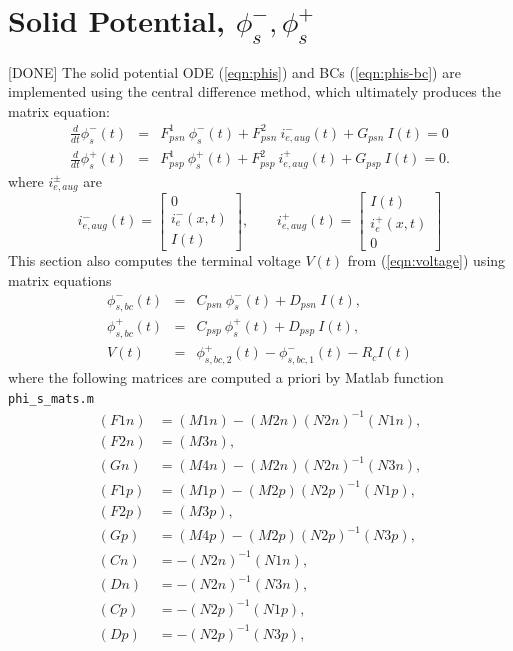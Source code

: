 \documentclass[12pt]{article}
\newcommand{\green}[1]{{\color{green}#1}}
\begin{document}
\section{Solid Potential, $\phi_{s}^{-}, \phi_{s}^{+}$}\label{sec:phis}
\green{[DONE]} The solid potential ODE (\ref{eqn:phis}) and BCs (\ref{eqn:phis-bc}) are implemented using the central difference method, which ultimately produces the matrix equation:
\begin{eqnarray}
	\frac{d}{dt} \phi_{s}^{-}(t) &=& F^{1}_{psn} \ \phi_{s}^{-}(t) + F^{2}_{psn} \ i_{e,aug}^{-}(t) + G_{psn} \ I(t) = 0 \\
	\frac{d}{dt} \phi_{s}^{+}(t) &=& F^{1}_{psp} \ \phi_{s}^{+}(t) + F^{2}_{psp} \ i_{e,aug}^{+}(t) + G_{psp} \ I(t) = 0.
\end{eqnarray}
where $i_{e,aug}^{\pm}$ are 
\begin{equation}\label{eqn:i_ex}
i_{e,aug}^{-}(t) = 
\left[
\begin{array}{c}
  0 \\
  i_{e}^{-}(x,t) \\
  I(t)
\end{array}
\right], \qquad
i_{e,aug}^{+}(t) = 
\left[
\begin{array}{c}
  I(t) \\
  i_{e}^{+}(x,t) \\
  0
\end{array}
\right]
\end{equation}
This section also computes the terminal voltage $V(t)$ from (\ref{eqn:voltage}) using matrix equations
\begin{eqnarray}
	\phi_{s,bc}^{-}(t) &=& C_{psn} \ \phi_{s}^{-}(t) + D_{psn} \ I(t), \\
	\phi_{s,bc}^{+}(t) &=& C_{psp} \ \phi_{s}^{+}(t) + D_{psp} \ I(t), \\
	V(t) &=& \phi_{s,bc,2}^{+}(t) - \phi_{s,bc,1}^{-}(t) - R_c I(t)
\end{eqnarray}
where the following matrices are computed a priori by Matlab function \texttt{phi\_s\_mats.m}
\begin{align}
	(F1n) &= (M1n) - (M2n) (N2n)^{-1} (N1n), \\
	(F2n) &= (M3n), \\
	(Gn) &= (M4n) - (M2n) (N2n)^{-1} (N3n), \\
	(F1p) &= (M1p) - (M2p)(N2p)^{-1}(N1p), \\
	(F2p) &= (M3p), \\
	(Gp) &= (M4p) - (M2p)(N2p)^{-1}(N3p), \\
	(Cn) &= -(N2n)^{-1}(N1n), \\
	(Dn) &= -(N2n)^{-1}(N3n), \\
	(Cp) &= -(N2p)^{-1}(N1p), \\
	(Dp) &= -(N2p)^{-1}(N3p),
\end{align}
\end{document}
